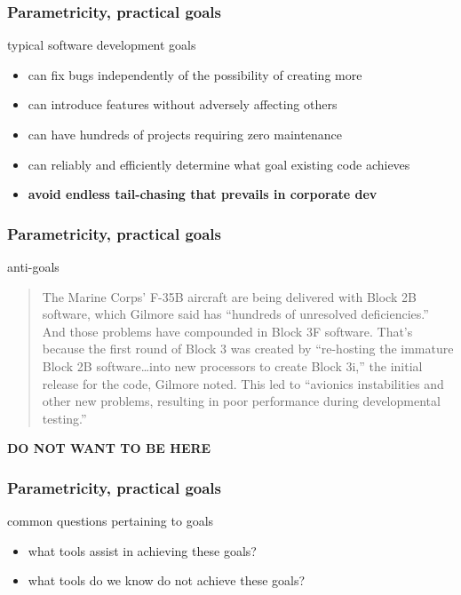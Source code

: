 \begin{frame}[fragile]
\frametitle{Parametricity, practical goals}
\begin{block}{typical software development goals}
\begin{itemize}
  \item<1-> can fix bugs independently of the possibility of creating more
  \item<2-> can introduce features without adversely affecting others
  \item<3-> can have hundreds of projects requiring zero maintenance
  \item<4-> can reliably and efficiently determine what goal existing code achieves
  \item<5-> \textbf{avoid endless tail-chasing that prevails in corporate dev}
\end{itemize}
\end{block}
\end{frame}

\begin{frame}[fragile]
\frametitle{Parametricity, practical goals}
\begin{block}{anti-goals}
\begin{quotation}
The Marine Corps' F-35B aircraft are being delivered with Block 2B software, which Gilmore said has ``hundreds of unresolved deficiencies.'' And those problems have compounded in Block 3F software. That's because the first round of Block 3 was created by ``re-hosting the immature Block 2B software…into new processors to create Block 3i,'' the initial release for the code, Gilmore noted. This led to ``avionics instabilities and other new problems, resulting in poor performance during developmental testing.''
\end{quotation}
\end{block}
\begin{center}
\textbf{DO NOT WANT TO BE HERE}
\end{center}
\end{frame}

\begin{frame}[fragile]
\frametitle{Parametricity, practical goals}
\begin{block}{common questions pertaining to goals}
\begin{itemize}
  \item what tools assist in achieving these goals?
  \item what tools do we know do not achieve these goals?
\end{itemize}
\end{block}
\end{frame}

